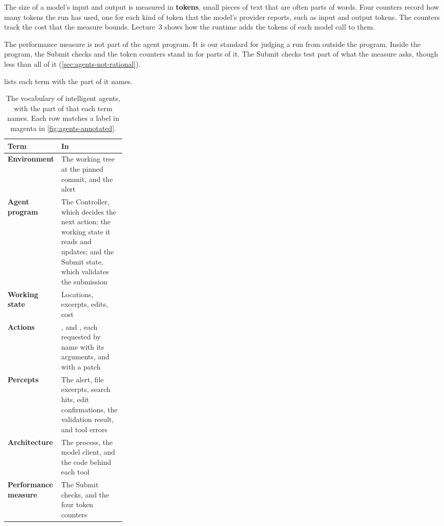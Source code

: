 The size of a model's input and output is measured in \textbf{tokens}, small pieces of text that
are often parts of words. Four counters record how many tokens the run has used, one for each kind
of token that the model's provider reports, such as input and output tokens. The counters track the
cost that the measure bounds. Lecture~3 shows how the runtime adds the tokens of each model call to
them.

The performance measure is not part of the agent program. It is our standard for judging a run
from outside the program. Inside the program, the Submit checks and the token counters stand in
for parts of it. The Submit checks test part of what the measure asks, though less than all of it
(\cref{sec:agents-not-rational}).

 lists each term with the part of \msa{} it names.

\begin{table}[htbp]
  \caption{The vocabulary of intelligent agents, with the part of \msa{} that each term names. Each
  row matches a label in magenta in \cref{fig:agents-annotated}.}
  \label{tab:agents-vocabulary}
  \begin{adjustbox}{width=\linewidth}\begin{tabularx}{\linewidth}{L{0.27\linewidth}X}
    \toprule
    \textbf{Term} & \textbf{In \msa{}} \\
    \midrule
    \textbf{Environment} & The working tree at the pinned commit, and the alert \\
    \textbf{Agent program} & The Controller, which decides the next action; the working state it
    reads and updates; and the Submit state, which validates the submission \\
    \textbf{Working state} & Locations, excerpts, edits, cost \\
    \textbf{Actions} & ,  and
    , each requested by name with its arguments, and 
    with a patch \\
    \textbf{Percepts} & The alert, file excerpts, search hits, edit confirmations, the validation
    result, and tool errors \\
    \textbf{Architecture} & The process, the model client, and the code behind each tool \\
    \textbf{Performance measure} & The Submit checks, and the four token counters \\
    \bottomrule
  \end{tabularx}\end{adjustbox}
\end{table}


